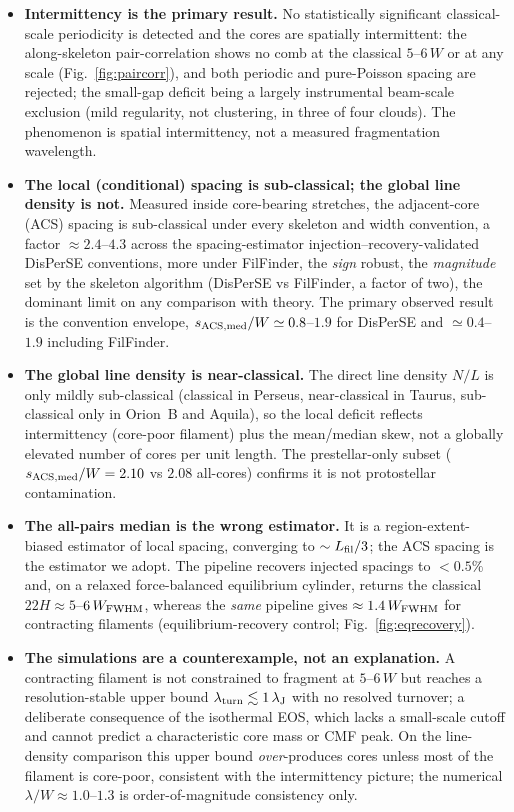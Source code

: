 \documentclass[usenatbib,twoside,twocolumn]{mnras}
\begin{document}
\begin{itemize}
    \item \textbf{Intermittency is the primary result.} No statistically significant classical-scale periodicity is detected and the cores are spatially intermittent: the along-skeleton pair-correlation shows no comb at the classical $5$--$6\,W$ or at any scale (Fig.~\ref{fig:paircorr}), and both periodic and pure-Poisson spacing are rejected; the small-gap deficit being a largely instrumental beam-scale exclusion (mild regularity, not clustering, in three of four clouds). The phenomenon is spatial intermittency, not a measured fragmentation wavelength.
    \item \textbf{The local (conditional) spacing is sub-classical; the global line density is not.} Measured inside core-bearing stretches, the adjacent-core (ACS) spacing is sub-classical under every skeleton and width convention, a factor $\approx2.4$--$4.3$ across the spacing-estimator injection--recovery-validated DisPerSE conventions, more under FilFinder, the \emph{sign} robust, the \emph{magnitude} set by the skeleton algorithm (DisPerSE vs FilFinder, a factor of two), the dominant limit on any comparison with theory. The primary observed result is the convention envelope, $s_{\rm ACS,med}/W\simeq0.8$--$1.9$ for DisPerSE and $\simeq0.4$--$1.9$ including FilFinder.
    \item \textbf{The global line density is near-classical.} The direct line density $N/L$ is only mildly sub-classical (classical in Perseus, near-classical in Taurus, sub-classical only in Orion~B and Aquila), so the local deficit reflects intermittency (core-poor filament) plus the mean/median skew, not a globally elevated number of cores per unit length. The prestellar-only subset ($s_{\rm ACS,med}/W=2.10$ vs $2.08$ all-cores) confirms it is not protostellar contamination.
    \item \textbf{The all-pairs median is the wrong estimator.} It is a region-extent-biased estimator of local spacing, converging to $\sim L_{\rm fil}/3$; the ACS spacing is the estimator we adopt. The pipeline recovers injected spacings to $<0.5\%$ and, on a relaxed force-balanced equilibrium cylinder, returns the classical $22H\approx5$--$6\,W_{\rm FWHM}$, whereas the \emph{same} pipeline gives $\approx1.4\,W_{\rm FWHM}$ for contracting filaments (equilibrium-recovery control; Fig.~\ref{fig:eqrecovery}).
    \item \textbf{The simulations are a counterexample, not an explanation.} A contracting filament is not constrained to fragment at $5$--$6\,W$ but reaches a resolution-stable upper bound $\lambda_{\rm turn}\lesssim1\,\lambda_{\rm J}$ with no resolved turnover; a deliberate consequence of the isothermal EOS, which lacks a small-scale cutoff and cannot predict a characteristic core mass or CMF peak. On the line-density comparison this upper bound \emph{over}-produces cores unless most of the filament is core-poor, consistent with the intermittency picture; the numerical $\lambda/W\approx1.0$--$1.3$ is order-of-magnitude consistency only.

\end{itemize}
\end{document}
